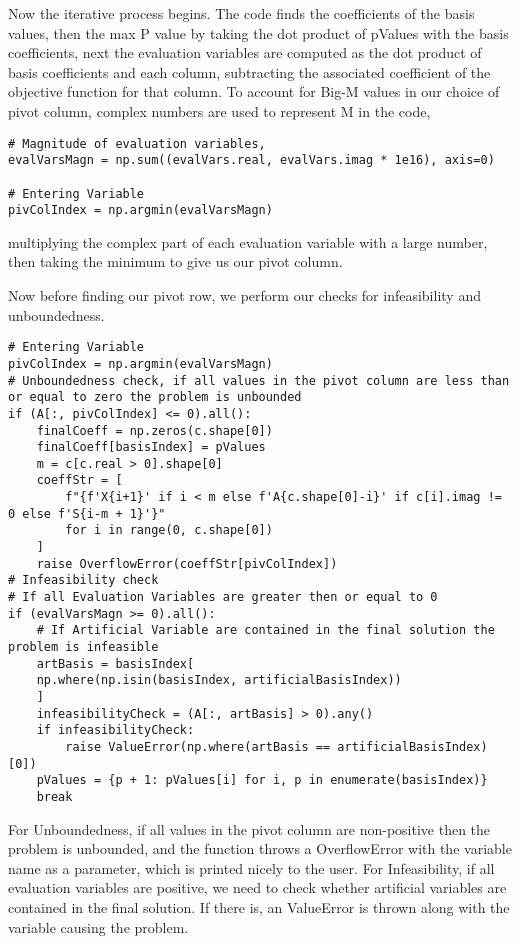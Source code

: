 \documentclass[letterpaper, a4paper]{article}
\begin{document}
Now the iterative process begins. The code finds the coefficients of the basis values, then the max P value by taking the dot product of pValues with the basis coefficients, next the evaluation variables are computed as the dot product of basis coefficients and each column, subtracting the associated coefficient of the objective function for that column.
To account for Big-M values in our choice of pivot column, complex numbers are used to represent M in the code,


\begingroup
\fontsize{8}{10}\selectfont
\begin{verbatim}
# Magnitude of evaluation variables,
evalVarsMagn = np.sum((evalVars.real, evalVars.imag * 1e16), axis=0)

# Entering Variable
pivColIndex = np.argmin(evalVarsMagn)
\end{verbatim}
\endgroup
multiplying the complex part of each evaluation variable with a large number, then taking the minimum to give us our pivot column.

Now before finding our pivot row, we perform our checks for infeasibility and unboundedness.

\begingroup
\fontsize{8}{10}\selectfont
\begin{verbatim}
# Entering Variable
pivColIndex = np.argmin(evalVarsMagn)
# Unboundedness check, if all values in the pivot column are less than or equal to zero the problem is unbounded
if (A[:, pivColIndex] <= 0).all():
    finalCoeff = np.zeros(c.shape[0])
    finalCoeff[basisIndex] = pValues
    m = c[c.real > 0].shape[0]
    coeffStr = [
        f"{f'X{i+1}' if i < m else f'A{c.shape[0]-i}' if c[i].imag != 0 else f'S{i-m + 1}'}"
        for i in range(0, c.shape[0])
    ]
    raise OverflowError(coeffStr[pivColIndex])
# Infeasibility check
# If all Evaluation Variables are greater then or equal to 0
if (evalVarsMagn >= 0).all():
    # If Artificial Variable are contained in the final solution the problem is infeasible
    artBasis = basisIndex[
    np.where(np.isin(basisIndex, artificialBasisIndex))
    ]
    infeasibilityCheck = (A[:, artBasis] > 0).any()
    if infeasibilityCheck:
        raise ValueError(np.where(artBasis == artificialBasisIndex)[0])
    pValues = {p + 1: pValues[i] for i, p in enumerate(basisIndex)}
    break
\end{verbatim}
\endgroup

For Unboundedness, if all values in the pivot column are non-positive then the problem is unbounded, and the function throws a OverflowError with the variable name as a parameter, which is printed nicely to the user.
For Infeasibility, if all evaluation variables are positive, we need to check whether artificial variables are contained in the final solution. If there is, an ValueError is thrown along with the variable causing the problem.
\end{document}
